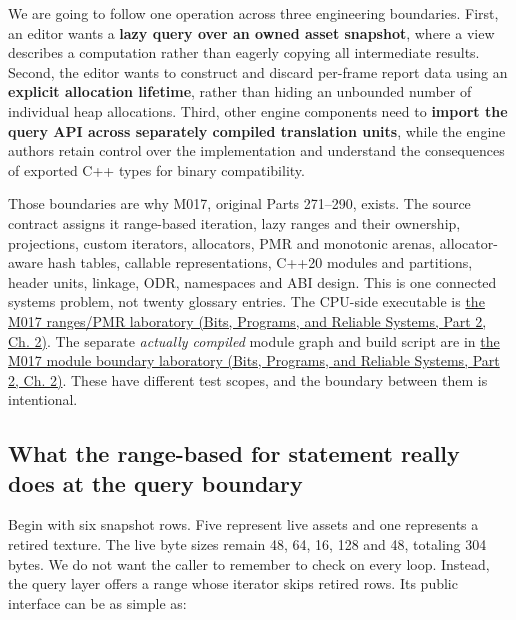 We are going to follow one operation across three engineering boundaries. First, an editor wants a \textbf{lazy query over an owned asset snapshot}, where a view describes a computation rather than eagerly copying all intermediate results. Second, the editor wants to construct and discard per-frame report data using an \textbf{explicit allocation lifetime}, rather than hiding an unbounded number of individual heap allocations. Third, other engine components need to \textbf{import the query API across separately compiled translation units}, while the engine authors retain control over the implementation and understand the consequences of exported C++ types for binary compatibility.

Those boundaries are why M017, original Parts 271--290, exists. The source contract assigns it range-based iteration, lazy ranges and their ownership, projections, custom iterators, allocators, PMR and monotonic arenas, allocator-aware hash tables, callable representations, C++20 modules and partitions, header units, linkage, ODR, namespaces and ABI design. This is one connected systems problem, not twenty glossary entries. The CPU-side executable is \href{../01-Bits-Programs-and-Reliable-Systems-P02/main.pdf\#nameddest=source-file-a1c76c44bc377537c732f5c4}{the M017 ranges/PMR laboratory (Bits, Programs, and Reliable Systems, Part 2, Ch. 2)}. The separate \emph{actually compiled} module graph and build script are in \href{../01-Bits-Programs-and-Reliable-Systems-P02/main.pdf\#nameddest=source-file-e1b7c3e4f52da0e7c9c36a41}{the M017 module boundary laboratory (Bits, Programs, and Reliable Systems, Part 2, Ch. 2)}. These have different test scopes, and the boundary between them is intentional.

\subsection{What the range-based for statement really does at the query boundary}\label{05-engine-i-ch006-what-the-range-based-for-statement-really-does-at-the-query-boundary}

\hypertarget{05-engine-i-ch006-what-the-range-based-for-statement-really-does-at-the-query-boundary}{}

Begin with six snapshot rows. Five represent live assets and one represents a retired texture. The live byte sizes remain 48, 64, 16, 128 and 48, totaling 304 bytes. We do not want the caller to remember to check  on every loop. Instead, the query layer offers a range whose iterator skips retired rows. Its public interface can be as simple as:

